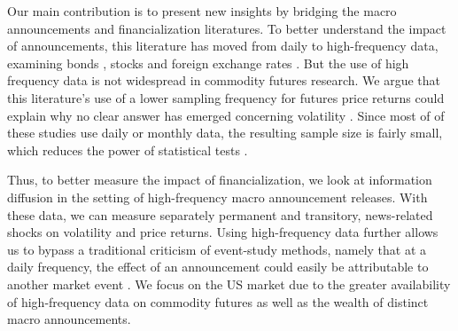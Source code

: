 \documentclass[12pt]{article}
\begin{document}
%



Our main contribution is to present new insights by bridging the macro announcements and financialization literatures. To better understand the impact of announcements, this literature has moved from daily to high-frequency data, examining  bonds  \citep{andersen2007real, hu2013noise, balduzzi2001economic,lee1995oil, hautsch2011impact, kurov2019price}, stocks \citep{andersen2007real,bernile2016can,kurov2019price} and foreign exchange rates \citep{lee1995oil,andersen2003micro}. But the use of high frequency data is not widespread in commodity futures research. We argue that this literature's use of a lower sampling frequency for futures price returns could explain why no clear answer has emerged concerning volatility \citep{tang2012index,brunetti2016speculators,irwin2012testing,stoll2010commodity,alquist2013role}. Since most of of these studies use daily or monthly data, the resulting sample size is fairly small, which reduces the power of statistical tests \citep{irwin2009devil}.  

Thus, to better measure the impact of financialization, we look at information diffusion in the setting of high-frequency macro announcement releases. With these data, we can measure separately permanent and transitory, news-related shocks on volatility and price returns.
Using high-frequency data further allows us to bypass a traditional criticism of event-study methods, namely that at a daily frequency, the effect of an announcement could easily be attributable to another market event \citep{kothari2007econometrics}. We focus on the US market due to the greater availability of high-frequency data on commodity futures as well as the wealth of distinct macro announcements.
\end{document}
